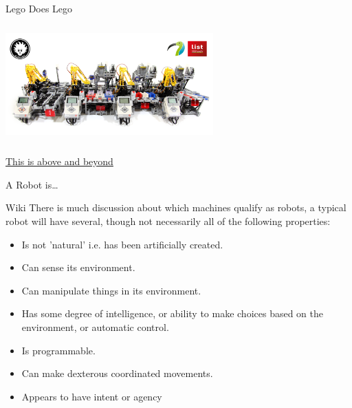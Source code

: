 \documentclass[color=pdftex,usenames,dvipsnames, aspectratio=169]{beamer}
\begin{document}
\begin{frame}[fragile]{Lego Does Lego}
\begin{center}
\includegraphics[width=8cm,height=4.5cm]{Videos/LEGO-Car-Factory-feat.jpg}

\href{https://www.youtube.com/watch?v=VSzkiu9uhgU}{This is above and beyond}

\end{center}
\end{frame}

\begin{frame}[label=robotDef]{A Robot is\ldots}
  \begin{block}{Wiki}
    There is \alert{much} discussion about which machines qualify as robots, a typical robot will have several, though not necessarily all of the following properties:
    \begin{itemize}
     \item Is \alert{not 'natural'} i.e. has been artificially created.
     \item Can \alert{sense} its environment.
     \item Can \alert{manipulate things} in its environment.
     \item Has some \alert{degree of intelligence}, or ability to make choices based on the environment, or automatic control.
     \item Is \alert{programmable}.
     \item Can make \alert{dexterous coordinated movements}.
     \item Appears to have \alert{intent} or agency
    \end{itemize}
  \end{block}

\end{frame}
\end{document}
